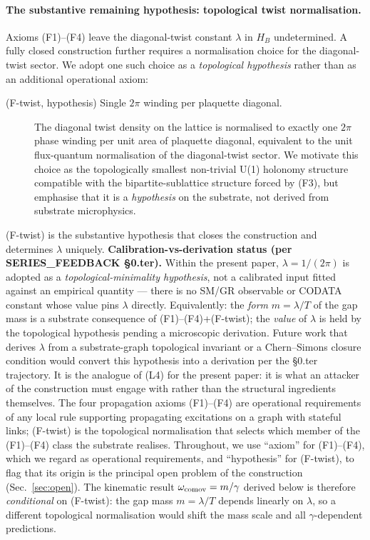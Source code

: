 \documentclass[11pt,a4paper]{article}
\begin{document}
\paragraph{The substantive remaining hypothesis: topological
twist normalisation.}
Axioms (F1)--(F4) leave the diagonal-twist constant $\lambda$
in $H_B$ undetermined. A fully closed construction further
requires a normalisation choice for the diagonal-twist sector.
We adopt one such choice as a \emph{topological hypothesis}
rather than as an additional operational axiom:

\begin{description}
\item[(F-twist, hypothesis) Single $2\pi$ winding per plaquette
diagonal.]
The diagonal twist density on the lattice is normalised to
exactly one $2\pi$ phase winding per unit area of plaquette
diagonal, equivalent to the unit flux-quantum normalisation of
the diagonal-twist sector. We motivate this choice as the
topologically smallest non-trivial U(1) holonomy structure
compatible with the bipartite-sublattice structure forced by
(F3), but emphasise that it is a \emph{hypothesis} on the
substrate, not derived from substrate microphysics.
\end{description}

(F-twist) is the substantive hypothesis that closes the
construction and determines $\lambda$ uniquely.
\textbf{Calibration-vs-derivation status (per
SERIES\_FEEDBACK §0.ter).} Within the present paper,
$\lambda = 1/(2\pi)$ is adopted as a \emph{topological-minimality
hypothesis}, not a calibrated input fitted against an empirical
quantity --- there is no SM/GR observable or CODATA constant
whose value pins $\lambda$ directly. Equivalently: the
\emph{form} $m = \lambda/T$ of the gap mass is a substrate
consequence of (F1)--(F4)+(F-twist); the \emph{value} of
$\lambda$ is held by the topological hypothesis pending a
microscopic derivation. Future work that derives $\lambda$ from
a substrate-graph topological invariant or a Chern--Simons
closure condition would convert this hypothesis into a
derivation per the §0.ter trajectory. It is the
analogue of (L4) for the present paper: it is what an attacker
of the construction must engage with rather than the structural
ingredients themselves. The four propagation axioms (F1)--(F4)
are operational requirements of any local rule supporting
propagating excitations on a graph with stateful links;
(F-twist) is the topological normalisation that selects which
member of the (F1)--(F4) class the substrate realises.
Throughout, we use ``axiom'' for (F1)--(F4), which we regard as
operational requirements, and ``hypothesis'' for (F-twist), to
flag that its origin is the principal open problem of the
construction (Sec.~\ref{sec:open}). The kinematic result
$\omega_{\rm comov} = m/\gamma$ derived below is therefore
\emph{conditional} on (F-twist): the gap mass $m = \lambda/T$
depends linearly on $\lambda$, so a different topological
normalisation would shift the mass scale and all $\gamma$-dependent
predictions.
\end{document}
